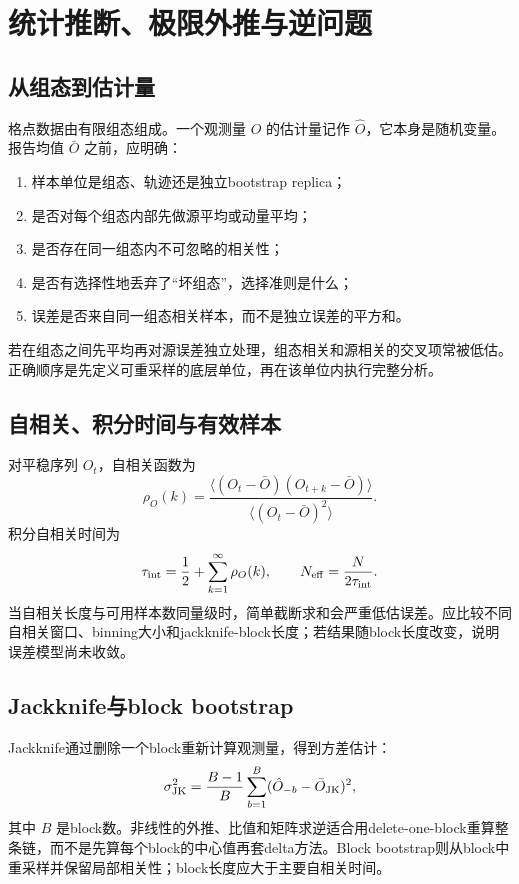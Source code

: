 \documentclass[UTF8,12pt,a4paper,twoside,openany]{ctexbook}
\begin{document}
\clearpage
\chapter{统计推断、极限外推与逆问题}
\label{sec:statistics-inverse}

\section{从组态到估计量}

格点数据由有限组态组成。一个观测量 \(O\) 的估计量记作 \(\hat O\)，它本身是随机变量。报告均值 \(\bar O\) 之前，应明确：
\begin{enumerate}
  \item 样本单位是组态、轨迹还是独立bootstrap replica；
  \item 是否对每个组态内部先做源平均或动量平均；
  \item 是否存在同一组态内不可忽略的相关性；
  \item 是否有选择性地丢弃了“坏组态”，选择准则是什么；
  \item 误差是否来自同一组态相关样本，而不是独立误差的平方和。
\end{enumerate}
若在组态之间先平均再对源误差独立处理，组态相关和源相关的交叉项常被低估。正确顺序是先定义可重采样的底层单位，再在该单位内执行完整分析。

\section{自相关、积分时间与有效样本}

对平稳序列 \(O_t\)，自相关函数为
\begin{equation}
  \rho_O(k)=\frac{\langle(O_t-\bar O)(O_{t+k}-\bar O)\rangle}
  {\langle(O_t-\bar O)^2\rangle}.
  \label{eq:autocorrelation}
\end{equation}
积分自相关时间为
\begin{equation}
  \tau_{\rm int}=\frac12+\sum_{k=1}^{\infty}\rho_O(k),
  \qquad
  N_{\rm eff}=\frac{N}{2\tau_{\rm int}}.
  \label{eq:tau-int}
\end{equation}
当自相关长度与可用样本数同量级时，简单截断求和会严重低估误差。应比较不同自相关窗口、binning大小和jackknife-block长度；若结果随block长度改变，说明误差模型尚未收敛。

\section{Jackknife与block bootstrap}

Jackknife通过删除一个block重新计算观测量，得到方差估计：
\begin{equation}
  \sigma_{\rm JK}^2
  =\frac{B-1}{B}\sum_{b=1}^{B}
  (\hat O_{-b}-\bar O_{\rm JK})^2,
  \label{eq:jackknife}
\end{equation}
其中 \(B\) 是block数。非线性的外推、比值和矩阵求逆适合用delete-one-block重算整条链，而不是先算每个block的中心值再套delta方法。Block bootstrap则从block中重采样并保留局部相关性；block长度应大于主要自相关时间。
\end{document}

